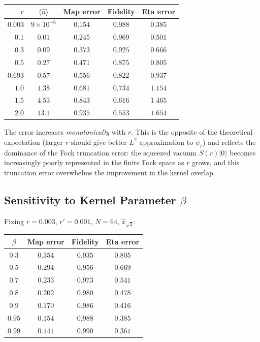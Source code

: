 \documentclass[11pt]{article}
\begin{document}
\begin{center}
\begin{tabular}{rcccc}
  \toprule
  $r$ & $\langle\hat{n}\rangle$ & Map error & Fidelity & Eta error \\
  \midrule
  $0.003$ & $9\times10^{-6}$ & $\mathbf{0.154}$ & $\mathbf{0.988}$ & $0.385$ \\
  $0.1$ & $0.01$ & $0.245$ & $0.969$ & $0.501$ \\
  $0.3$ & $0.09$ & $0.373$ & $0.925$ & $0.666$ \\
  $0.5$ & $0.27$ & $0.471$ & $0.875$ & $0.805$ \\
  $0.693$ & $0.57$ & $0.556$ & $0.822$ & $0.937$ \\
  $1.0$ & $1.38$ & $0.681$ & $0.734$ & $1.154$ \\
  $1.5$ & $4.53$ & $0.843$ & $0.616$ & $1.465$ \\
  $2.0$ & $13.1$ & $0.935$ & $0.553$ & $1.654$ \\
  \bottomrule
\end{tabular}
\end{center}

The error increases \emph{monotonically} with $r$.  This is the opposite of
the theoretical expectation (larger $r$ should give better $L^2$ approximation
to $\psi_r$) and reflects the dominance of the Fock truncation error:
the squeezed vacuum $S(r)|0\rangle$ becomes increasingly poorly represented
in the finite Fock space as $r$ grows, and this truncation error overwhelms
the improvement in the kernel overlap.

\subsection{Sensitivity to Kernel Parameter $\beta$}

Fixing $r = 0.003$, $r' = 0.001$, $N = 64$, $\hat{x}_{\sqrt{2}}$:

\begin{center}
\begin{tabular}{cccc}
  \toprule
  $\beta$ & Map error & Fidelity & Eta error \\
  \midrule
  $0.3$ & $0.354$ & $0.935$ & $0.805$ \\
  $0.5$ & $0.294$ & $0.956$ & $0.669$ \\
  $0.7$ & $0.233$ & $0.973$ & $0.541$ \\
  $0.8$ & $0.202$ & $0.980$ & $0.478$ \\
  $0.9$ & $0.170$ & $0.986$ & $0.416$ \\
  $0.95$ & $\mathbf{0.154}$ & $\mathbf{0.988}$ & $\mathbf{0.385}$ \\
  $0.99$ & $0.141$ & $0.990$ & $0.361$ \\
  \bottomrule
\end{tabular}
\end{center}
\end{document}
